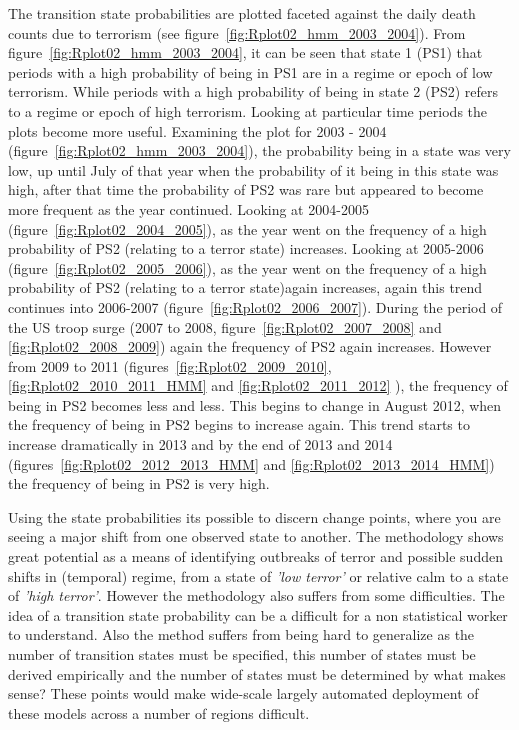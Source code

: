 The transition state probabilities are plotted faceted against the daily death counts due to terrorism (see figure~\ref{fig:Rplot02_hmm_2003_2004}). From figure~\ref{fig:Rplot02_hmm_2003_2004}, it can be seen that state 1 (PS1) that periods with a high probability of being in PS1 are in a regime or epoch of low terrorism. While periods with a high probability of being in state 2 (PS2) refers to a  regime or epoch of high terrorism. Looking at particular time periods the plots become more useful. Examining the plot for 2003 - 2004 (figure~\ref{fig:Rplot02_hmm_2003_2004}), the probability being in a state was very low, up until July of that year when the probability of it being in this state was high, after that time the probability of PS2 was rare but appeared to become more frequent as the year continued. Looking at 2004-2005 (figure~\ref{fig:Rplot02_2004_2005}), as the year went on the frequency of a high probability of PS2 (relating to a terror state) increases. Looking at 2005-2006 (figure~\ref{fig:Rplot02_2005_2006}), as the year went on the frequency of a high probability of PS2 (relating to a terror state)again increases, again this trend continues into 2006-2007 (figure~\ref{fig:Rplot02_2006_2007}). During the period of the US troop surge (2007 to 2008, figure~\ref{fig:Rplot02_2007_2008} and \ref{fig:Rplot02_2008_2009}) again the frequency of PS2 again increases. However  from 2009 to 2011 (figures~\ref{fig:Rplot02_2009_2010}, \ref{fig:Rplot02_2010_2011_HMM} and \ref{fig:Rplot02_2011_2012} ), the frequency of being in PS2 becomes less and less. This begins to change in August 2012, when the frequency of being in PS2 begins to increase again. This trend starts to increase dramatically  in 2013 and by the end of 2013 and 2014 (figures~\ref{fig:Rplot02_2012_2013_HMM} and \ref{fig:Rplot02_2013_2014_HMM})  the frequency of being in PS2 is very high.  

Using the state probabilities its possible to discern change points, where you are seeing a major shift from one observed state to another. The methodology shows great potential as a means of identifying outbreaks of terror and possible sudden shifts in (temporal) regime, from a state of \textit{'low terror'} or relative calm to a state of \textit{'high terror'}. However the methodology also suffers from some difficulties. The idea of a transition state probability can be a difficult for a non statistical worker to understand. Also the method suffers from being hard to generalize as the number of transition states must be specified, this number of states must be derived empirically and the number of states must be determined by what makes sense? These points would make wide-scale largely automated deployment of these models across a number of regions difficult. 

